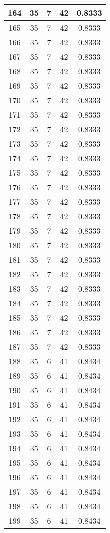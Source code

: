 \documentclass[letterpaper, 12pt]{article}
\begin{document}
\begin{longtable}{|c|c|c|c|c|}
\hline
164 & 35 & 7 & 42 & 0.8333 \\
\hline
165 & 35 & 7 & 42 & 0.8333 \\
\hline
166 & 35 & 7 & 42 & 0.8333 \\
\hline
167 & 35 & 7 & 42 & 0.8333 \\
\hline
168 & 35 & 7 & 42 & 0.8333 \\
\hline
169 & 35 & 7 & 42 & 0.8333 \\
\hline
170 & 35 & 7 & 42 & 0.8333 \\
\hline
171 & 35 & 7 & 42 & 0.8333 \\
\hline
172 & 35 & 7 & 42 & 0.8333 \\
\hline
173 & 35 & 7 & 42 & 0.8333 \\
\hline
174 & 35 & 7 & 42 & 0.8333 \\
\hline
175 & 35 & 7 & 42 & 0.8333 \\
\hline
176 & 35 & 7 & 42 & 0.8333 \\
\hline
177 & 35 & 7 & 42 & 0.8333 \\
\hline
178 & 35 & 7 & 42 & 0.8333 \\
\hline
179 & 35 & 7 & 42 & 0.8333 \\
\hline
180 & 35 & 7 & 42 & 0.8333 \\
\hline
181 & 35 & 7 & 42 & 0.8333 \\
\hline
182 & 35 & 7 & 42 & 0.8333 \\
\hline
183 & 35 & 7 & 42 & 0.8333 \\
\hline
184 & 35 & 7 & 42 & 0.8333 \\
\hline
185 & 35 & 7 & 42 & 0.8333 \\
\hline
186 & 35 & 7 & 42 & 0.8333 \\
\hline
187 & 35 & 7 & 42 & 0.8333 \\
\hline
188 & 35 & 6 & 41 & 0.8434 \\
\hline
189 & 35 & 6 & 41 & 0.8434 \\
\hline
190 & 35 & 6 & 41 & 0.8434 \\
\hline
191 & 35 & 6 & 41 & 0.8434 \\
\hline
192 & 35 & 6 & 41 & 0.8434 \\
\hline
193 & 35 & 6 & 41 & 0.8434 \\
\hline
194 & 35 & 6 & 41 & 0.8434 \\
\hline
195 & 35 & 6 & 41 & 0.8434 \\
\hline
196 & 35 & 6 & 41 & 0.8434 \\
\hline
197 & 35 & 6 & 41 & 0.8434 \\
\hline
198 & 35 & 6 & 41 & 0.8434 \\
\hline
199 & 35 & 6 & 41 & 0.8434 \\
\hline
\end{longtable}
\end{document}
